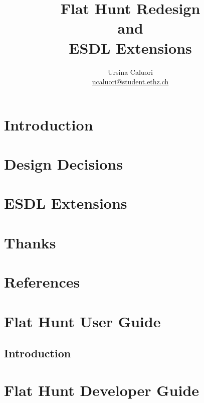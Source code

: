\documentclass[a4paper,titlepage,12pt]{article}
\title{\textbf{Flat Hunt Redesign\\and\\ESDL Extensions}}
\author{Ursina Caluori\\ \href{mailto: ucaluori@student.ethz.ch}{ucaluori@student.ethz.ch}}
\begin{document}
  \maketitle
  \tableofcontents
  \pagebreak

  \section{Introduction}
    
  \section{Design Decisions}
    
  \section{ESDL Extensions}
    
  \section{Thanks}
    
  \section{References}
    
    
  \appendix
  \section{Flat Hunt User Guide}
    \subsection{Introduction}
    
  \section{Flat Hunt Developer Guide}
  
\end{document}
